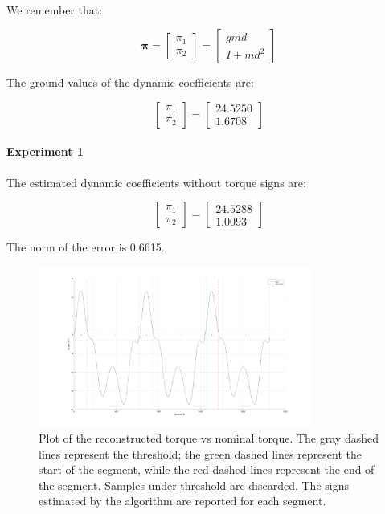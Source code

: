 \documentclass{article}
\begin{document}
\paragraph{}We remember that:

\[\bm{\pi}= \begin{bmatrix}
\pi_1 \\ \pi_2
\end{bmatrix} = \begin{bmatrix}
gmd \\ I +md^2
\end{bmatrix}\]

The ground values of the dynamic coefficients are:

\[\begin{bmatrix}
\pi_1 \\ \pi_2
\end{bmatrix}=\begin{bmatrix}
24.5250 \\ 1.6708
\end{bmatrix}\]

\paragraph{Experiment 1} The estimated dynamic coefficients without torque signs are:

\[\begin{bmatrix}
\pi_1  \\ \pi_2 
\end{bmatrix}=\begin{bmatrix}
24.5288 \\ 1.0093
\end{bmatrix}\]

The norm of the error is 0.6615.

\begin{figure}[!htbp]
\centering
\includegraphics[width=0.8\textwidth]{images/1-dof/results_experiment1.png}
\caption{Plot of the reconstructed torque vs nominal torque. The gray dashed lines represent the threshold; the green dashed lines represent the start of the segment, while the red dashed lines represent the end of the segment. Samples under threshold are discarded. The signs estimated by the algorithm are reported for each segment.}
\end{figure}
\FloatBarrier
\end{document}
